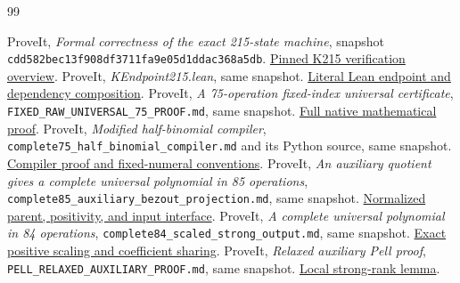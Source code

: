 \documentclass[11pt]{article}
\theoremstyle{remark}\newtheorem{remark}[theorem]{Remark}
\newcommand{\snap}{\texttt{cdd582bec13f908df3711fa9e05d1ddac368a5db}}
\begin{document}
\begin{thebibliography}{99}
\raggedright
{} ProveIt, \emph{Formal correctness of the exact
215-state machine}, snapshot \snap.
\href{https://github.com/VladimirReshetnikov/ProveIt/blob/cdd582bec13f908df3711fa9e05d1ddac368a5db/Computability/BusyBeaver/Research/ZFC/k225-formal/verification/k215/README.md}{Pinned K215 verification overview}.
 ProveIt, \emph{KEndpoint215.lean}, same snapshot.
\href{https://github.com/VladimirReshetnikov/ProveIt/blob/cdd582bec13f908df3711fa9e05d1ddac368a5db/Computability/BusyBeaver/Lean/BusyBeaver/ZFC/KEndpoint215.lean}{Literal Lean endpoint and dependency composition}.
 ProveIt, \emph{A 75-operation fixed-index universal
certificate}, \texttt{FIXED\_RAW\_UNIVERSAL\_75\_PROOF.md}, same snapshot.
\href{https://github.com/VladimirReshetnikov/ProveIt/blob/cdd582bec13f908df3711fa9e05d1ddac368a5db/Computability/HilbertTenthProblem/Papers/1980/FIXED_RAW_UNIVERSAL_75_PROOF.md}{Full native mathematical proof}.
 ProveIt, \emph{Modified half-binomial compiler},
\texttt{complete75\_half\_binomial\_compiler.md} and its Python source,
same snapshot.
\href{https://github.com/VladimirReshetnikov/ProveIt/blob/cdd582bec13f908df3711fa9e05d1ddac368a5db/Computability/HilbertTenthProblem/Papers/research-wip/native-stream-queue/complete75_half_binomial_compiler.md}{Compiler proof and fixed-numeral conventions}.
 ProveIt, \emph{An auxiliary quotient gives a complete
universal polynomial in 85 operations},
\texttt{complete85\_auxiliary\_bezout\_projection.md}, same snapshot.
\href{https://github.com/VladimirReshetnikov/ProveIt/blob/cdd582bec13f908df3711fa9e05d1ddac368a5db/Computability/HilbertTenthProblem/Papers/research-wip/native-stream-queue/complete85_auxiliary_bezout_projection.md}{Normalized parent, positivity, and input interface}.
 ProveIt, \emph{A complete universal polynomial in
84 operations}, \texttt{complete84\_scaled\_strong\_output.md}, same snapshot.
\href{https://github.com/VladimirReshetnikov/ProveIt/blob/cdd582bec13f908df3711fa9e05d1ddac368a5db/Computability/HilbertTenthProblem/Papers/research-wip/native-stream-queue/complete84_scaled_strong_output.md}{Exact positive scaling and coefficient sharing}.
 ProveIt, \emph{Relaxed auxiliary Pell proof},
\texttt{PELL\_RELAXED\_AUXILIARY\_PROOF.md}, same snapshot.
\href{https://github.com/VladimirReshetnikov/ProveIt/blob/cdd582bec13f908df3711fa9e05d1ddac368a5db/Computability/HilbertTenthProblem/Papers/1980/PELL_RELAXED_AUXILIARY_PROOF.md}{Local strong-rank lemma}.

\end{thebibliography}
\end{document}
